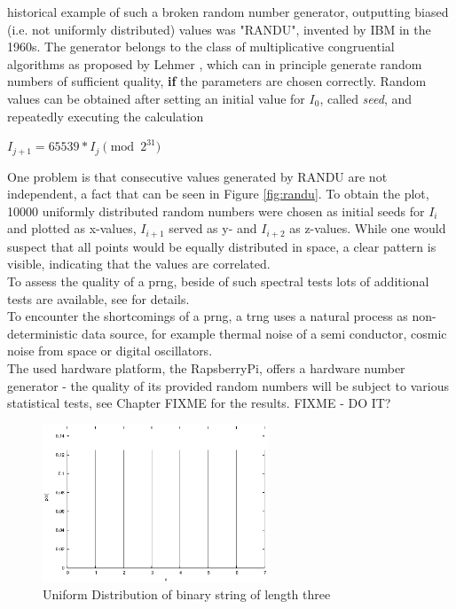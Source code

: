 historical example of such a broken random number generator, outputting biased (i.e. not uniformly distributed) values was "RANDU", invented by IBM in the
1960s. 
The generator belongs to the class of multiplicative congruential algorithms as proposed by Lehmer \cite{MR0044899}, which can in principle generate random
numbers of sufficient quality, \textbf{if} the parameters are chosen correctly.
Random values can be obtained after setting an initial value for $I_0$, called \textit{seed}, and repeatedly executing the calculation
\begin{center}
 $I_{j+1} = 65539 * I_j \pmod{2^{31}}$		%
\end{center}
One problem 
is that consecutive values generated by RANDU are not independent, a fact that	 can be seen in Figure \ref{fig:randu}. To obtain the plot, 10000 uniformly distributed 
random numbers were chosen as initial seeds for $I_i$ and plotted as x-values, $I_{i+1}$ served as y- and $I_{i+2}$ as z-values. While one would suspect that all points
would be equally distributed in space, a clear pattern is visible, indicating that the values are correlated.
\\
To assess the quality of a \gls{prng}, beside of such spectral tests lots of additional tests are available, see \cite{nistRAND} for details.
\\
To encounter the shortcomings of a \gls{prng}, a \gls{trng} uses a natural process as non-deterministic data source, for example
thermal noise of a semi conductor, cosmic noise from space or digital oscillators.
\\
The used hardware platform, the RapsberryPi, offers a hardware number generator - the quality of its provided random numbers will be subject
to various statistical tests, see Chapter FIXME for the results. FIXME - DO IT?
\begin{figure}
    \centering
    \includegraphics[width=0.6\textwidth]{figures/uniform}
    \caption{Uniform Distribution of binary string of length three}
    \label{fig:uniform}
\end{figure}
